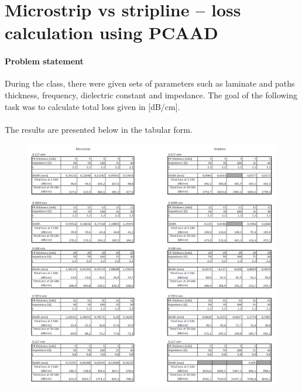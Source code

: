 \documentclass[eng,printmode]{mgr}
\begin{document}
\newpage
\chapter{Microstrip vs stripline -- loss calculation using PCAAD}
\subsubsection{Problem statement}
During the class, there were given sets of parameters such as laminate and paths thickness, frequency, dielectric constant and impedance. The goal of the following task was to calculate total loss given in [dB/cm].\\
\\
The results are presented below in the tabular form.
\begin{figure}[h]
	\centering
	\includegraphics[width=1\linewidth]{microm1}
	\label{fig:microm1}
\end{figure}
\end{document}

